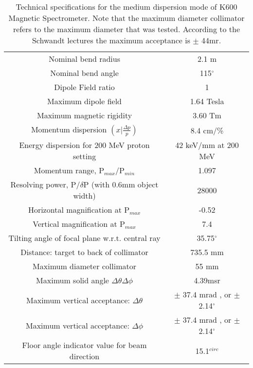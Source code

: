 \documentclass[11pt]{report}
\begin{document}
\begin{table}[!ht]
\centering
\begin{tabular}{c|c}
\hline
\hline
Nominal bend radius & 2.1 m\\
Nominal bend angle & 115$^{\circ}$\\
Dipole Field ratio & 1 \\
Maximum dipole field & 1.64 Tesla\\
Maximum magnetic rigidity & 3.60 Tm\\
Momentum dispersion $(x|\frac{\Delta p}{p})$ & 8.4 cm/\%\\
Energy dispersion for 200 MeV proton setting & 42 keV/mm at 200 MeV\\
Momentum range, P$_{max}$/P$_{min}$ & 1.097\\
Resolving power, P/$\delta$P (with 0.6mm object width) & 28000\\
Horizontal magnification at  P$_{max}$& -0.52\\
Vertical magnification at  P$_{max}$& 7.4\\
Tilting angle of focal plane w.r.t. central ray & 35.75$^{\circ}$\\
\hline
Distance: target to back of collimator & 735.5 mm\\
Maximum diameter collimator & 55 mm\\
Maximum solid angle $\Delta\theta\Delta\phi$ & 4.39msr\\
Maximum vertical acceptance: $\Delta\theta$ &  $\pm$ 37.4 mrad , or $\pm$ 2.14$^{\circ}$\\
Maximum vertical acceptance: $\Delta\phi$   &  $\pm$ 37.4 mrad , or $\pm$ 2.14$^{\circ}$\\
\hline
Floor angle indicator value for beam direction & 15.1$^{circ}$\\
\hline
\hline
\end{tabular}
\caption{Technical specifications for the medium dispersion mode of K600 Magnetic Spectrometer.
Note that the maximum diameter collimator refers to the maximum diameter that was tested. 
According to the Schwandt lectures \cite{Sch86} the maximum acceptance is $\pm$ 44mr.}
\label{table:k600-specifications}
\end{table}
\end{document}
